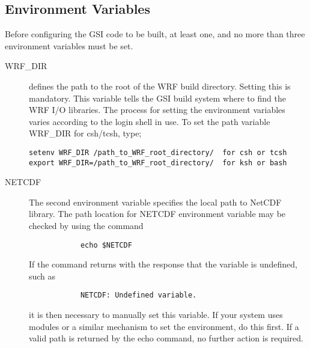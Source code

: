\subsection{Environment Variables} \label{ch2_compiling_env}

Before configuring the GSI code to be built, at least one, and no more than three environment variables must be set.

\begin{description}
\item[WRF\_DIR] defines the path to the root of the WRF build directory. Setting this is mandatory. This variable tells the GSI build system where to find the WRF I/O libraries. The process for setting the environment variables varies according to the login shell in use. To set the path variable WRF\_DIR for csh/tcsh, type;
\begin{verbatim}
setenv WRF_DIR /path_to_WRF_root_directory/  for csh or tcsh
export WRF_DIR=/path_to_WRF_root_directory/  for ksh or bash
\end{verbatim}
\item[NETCDF] The second environment variable specifies the local path to NetCDF library. The path location for NETCDF environment variable may be checked by using the command 
\begin{verbatim}
            echo $NETCDF
\end{verbatim}
If the command returns with the response that the variable is undefined, such as
\begin{verbatim}
            NETCDF: Undefined variable.
\end{verbatim}
it is then necessary to manually set this variable. If your system uses modules or a similar mechanism to set the environment, do this first. If a valid path is returned by the echo command, no further action is required.\\


\end{description}
